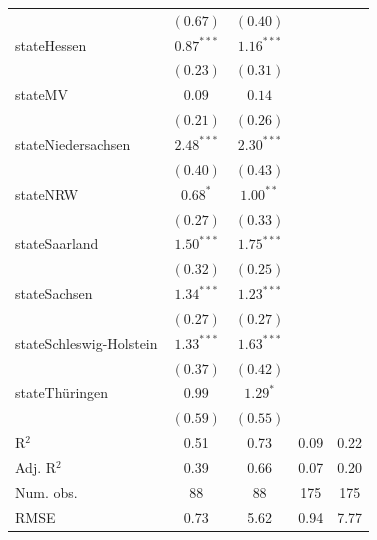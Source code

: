 \documentclass[12pt, a4paper, titlepage]{article}\usepackage[]{graphicx}\usepackage[]{color}
\begin{document}
\begin{table}
\begin{center}
{\begin{tabular}{l c c c c }
                          & $(0.67)$      & $(0.40)$     &              &            \\
stateHessen               & $0.87^{***}$  & $1.16^{***}$ &              &            \\
                          & $(0.23)$      & $(0.31)$     &              &            \\
stateMV                   & $0.09$        & $0.14$       &              &            \\
                          & $(0.21)$      & $(0.26)$     &              &            \\
stateNiedersachsen        & $2.48^{***}$  & $2.30^{***}$ &              &            \\
                          & $(0.40)$      & $(0.43)$     &              &            \\
stateNRW                  & $0.68^{*}$    & $1.00^{**}$  &              &            \\
                          & $(0.27)$      & $(0.33)$     &              &            \\
stateSaarland             & $1.50^{***}$  & $1.75^{***}$ &              &            \\
                          & $(0.32)$      & $(0.25)$     &              &            \\
stateSachsen              & $1.34^{***}$  & $1.23^{***}$ &              &            \\
                          & $(0.27)$      & $(0.27)$     &              &            \\
stateSchleswig-Holstein   & $1.33^{***}$  & $1.63^{***}$ &              &            \\
                          & $(0.37)$      & $(0.42)$     &              &            \\
stateThüringen            & $0.99$        & $1.29^{*}$   &              &            \\
                          & $(0.59)$      & $(0.55)$     &              &            \\
\hline
R$^2$                     & 0.51          & 0.73         & 0.09         & 0.22       \\
Adj. R$^2$                & 0.39          & 0.66         & 0.07         & 0.20       \\
Num. obs.                 & 88            & 88           & 175          & 175        \\
RMSE                      & 0.73          & 5.62         & 0.94         & 7.77       \\

\end{tabular}}
\end{center}
\end{table}
\end{document}
